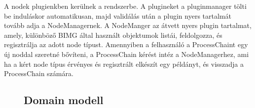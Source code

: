 \documentclass[a4paper,12pt,oneside]{report}
\begin{document}
A nodek plugienkben kerülnek a rendszerbe. A plugineket a pluginmanager tölti be induláskor automatikusan, majd validálás után a plugin nyers tartalmát tovább adja a NodeManagernek. A NodeManger az átvett nyers plugin tartalmat, amely, különböző BIMG által használt objektumok listái, feldolgozza, és regisztrálja az adott node típust. Amennyiben a felhasználó a ProcessChaint egy új noddal szeretné bővíteni, a ProcessChain kérést intéz a NodeManagerhez, ami ha a kért node típus érvényes és regisztrált elkészít egy példányt, és visszadja a ProcessChain számára.

\begin{landscape}
\begin{figure}[h]
  \subsection{Domain modell}

\end{figure}
\end{landscape}
\end{document}

